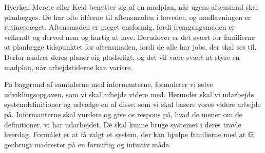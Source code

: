 Hverken Merete eller Keld benytter sig af en madplan, når ugens aftensmad skal planlægges. De har ofte idéerne til aftensmaden i hovedet, og madlavningen er rutinepræget. Aftensmaden er meget ensformig, fordi fremgangsmåden er velkendt og derved nem og hurtig at lave. Derudover er det svært for familierne at planlægge tidspunktet for aftensmaden, fordi de alle har jobs, der skal ses til. Derfor ændrer deres planer sig pludseligt, og det vil være svært at styre en madplan, når arbejdstiderne kan variere.

På baggrund af samtalerne med informanterne, formulerer vi selve udviklingsopgaven, som vi skal arbejde videre med. Herunder skal vi udarbejde systemdefinitioner og udvælge en af disse, som vi skal basere vores videre arbejde på. Informanterne skal vurdere og give os respons på, hvad de mener om de definitioner, vi har udarbejdet. De skal kunne bruge systemet i deres travle hverdag. Formålet er at få valgt et system, der kan hjælpe familierne med at få genbrugt madrester på en fornuftig og intuitiv måde.